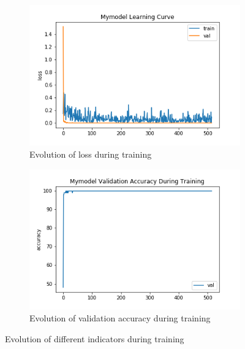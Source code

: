

\begin{figure}[h!]
  \begin{center}
    \begin{subfigure}[t]{0.49\linewidth}
      \centering
      \includegraphics[width=\linewidth]{../code/assignment/2_pytorch/mymodel_lossvstrain.png}
      \caption{Evolution of loss during training}
    \end{subfigure}
    \begin{subfigure}[t]{0.49\linewidth}
      \centering
      \includegraphics[width=\linewidth]{../code/assignment/2_pytorch/mymodel_valaccuracy.png}
      \caption{Evolution of validation accuracy during training}
    \end{subfigure}
    \caption{Evolution of different indicators during training}
  \end{center}
\end{figure}


